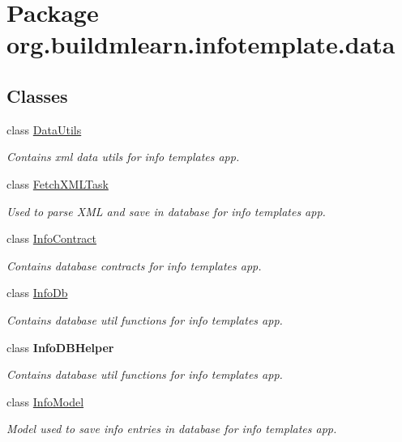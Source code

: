 \hypertarget{namespaceorg_1_1buildmlearn_1_1infotemplate_1_1data}{}\section{Package org.\+buildmlearn.\+infotemplate.\+data}
\label{namespaceorg_1_1buildmlearn_1_1infotemplate_1_1data}
\subsection*{Classes}
\begin{DoxyCompactItemize}
\item 
class \hyperlink{classorg_1_1buildmlearn_1_1infotemplate_1_1data_1_1DataUtils}{Data\+Utils}
\begin{DoxyCompactList}\small\item\em Contains xml data utils for info template\textquotesingle{}s app. \end{DoxyCompactList}\item 
class \hyperlink{classorg_1_1buildmlearn_1_1infotemplate_1_1data_1_1FetchXMLTask}{Fetch\+X\+M\+L\+Task}
\begin{DoxyCompactList}\small\item\em Used to parse X\+ML and save in database for info template\textquotesingle{}s app. \end{DoxyCompactList}\item 
class \hyperlink{classorg_1_1buildmlearn_1_1infotemplate_1_1data_1_1InfoContract}{Info\+Contract}
\begin{DoxyCompactList}\small\item\em Contains database contracts for info template\textquotesingle{}s app. \end{DoxyCompactList}\item 
class \hyperlink{classorg_1_1buildmlearn_1_1infotemplate_1_1data_1_1InfoDb}{Info\+Db}
\begin{DoxyCompactList}\small\item\em Contains database util functions for info template\textquotesingle{}s app. \end{DoxyCompactList}\item 
class {\bfseries Info\+D\+B\+Helper}
\begin{DoxyCompactList}\small\item\em Contains database util functions for info template\textquotesingle{}s app. \end{DoxyCompactList}\item 
class \hyperlink{classorg_1_1buildmlearn_1_1infotemplate_1_1data_1_1InfoModel}{Info\+Model}
\begin{DoxyCompactList}\small\item\em Model used to save info entries in database for info template\textquotesingle{}s app. \end{DoxyCompactList}\end{DoxyCompactItemize}
